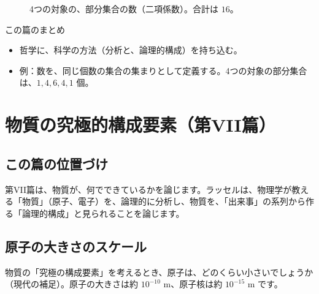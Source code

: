 \documentclass[a4paper,11pt,openany]{ltjsbook}
\begin{document}
\begin{figure}[htbp]
\centering
{}
\caption{4つの対象の、部分集合の数（二項係数）。合計は $16$。}
\end{figure}

\begin{pointbox}{この篇のまとめ}
\begin{itemize}[leftmargin=*]
\item 哲学に、科学の方法（分析と、論理的構成）を持ち込む。
\item 例：数を、同じ個数の集合の集まりとして定義する。4つの対象の部分集合は、$1,4,6,4,1$ 個。
\end{itemize}
\end{pointbox}

\chapter{物質の究極的構成要素（第VII篇）}

\section{この篇の位置づけ}

第VII篇は、物質が、何でできているかを論じます。ラッセルは、物理学が教える「物質」（原子、電子）を、論理的に分析し、物質を、「出来事」の系列から作る「論理的構成」と見られることを論じます。

\section{原子の大きさのスケール}

物質の「究極の構成要素」を考えるとき、原子は、どのくらい小さいでしょうか（現代の補足）。原子の大きさは約 $10^{-10}$ m、原子核は約 $10^{-15}$ m です。
\end{document}
